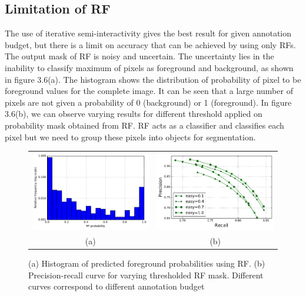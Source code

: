 \subsection{Limitation of RF}

The use of iterative semi-interactivity gives the best result for given annotation budget, but there is a limit on accuracy that can be achieved by using only RFs. The output mask of RF is noisy and uncertain. The uncertainty lies in the inability to classify maximum of pixels as foreground and background, as shown in figure 3.6(a). The histogram shows the distribution of probability of pixel to be foreground values for the complete image. It can be seen that a large number of pixels are not given a probability of 0 (background) or 1 (foreground). In figure 3.6(b), we can observe varying results for different threshold applied on probability mask obtained from RF. RF acts as a classifier and classifies each pixel but we need to group these pixels into objects for segmentation. 
\begin{figure}[h!] \label{fig:uncertain}
\begin{tabular}{cc}
 \includegraphics[width=0.5\linewidth]{figures/hist.pdf} & \includegraphics[width=0.5\linewidth]{figures/pr_curve.pdf} \\
  (a)  & (b) \\
\end{tabular}
\caption{(a) Histogram of predicted foreground probabilities using RF. (b) Precision-recall curve for varying thresholded RF mask. Different curves correspond to different annotation budget}
\end{figure}

